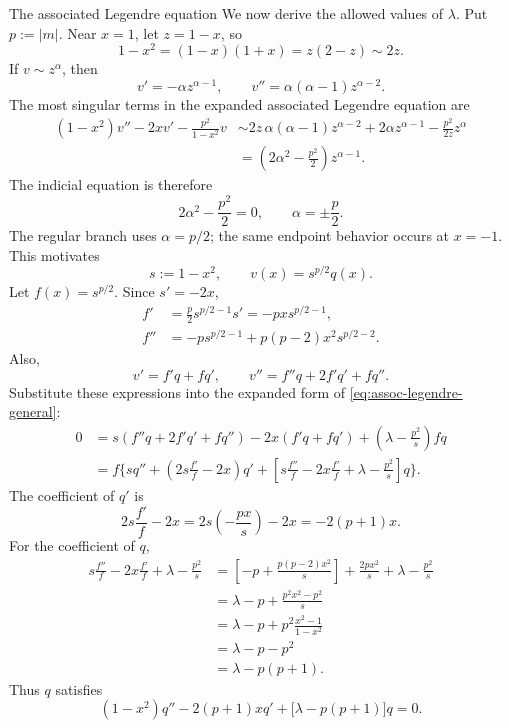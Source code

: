\documentclass[11pt]{beamer}
\begin{document}
\begin{frame}[allowframebreaks]{The associated Legendre equation}
We now derive the allowed values of $\lambda$.  Put $p:=|m|$.  Near
$x=1$, let $z=1-x$, so
\[
  1-x^2=(1-x)(1+x)=z(2-z)\sim2z.
\]
If $v\sim z^\alpha$, then
\[
  v'=-\alpha z^{\alpha-1},
  \qquad
  v''=\alpha(\alpha-1)z^{\alpha-2}.
\]
The most singular terms in the expanded associated Legendre equation are
\begin{align*}
  (1-x^2)v''-2xv'-\frac{p^2}{1-x^2}v
   &\sim
    2z\,\alpha(\alpha-1)z^{\alpha-2}
    +2\alpha z^{\alpha-1}
    -\frac{p^2}{2z}z^\alpha\\
   &=
    \left(2\alpha^2-\frac{p^2}{2}\right)z^{\alpha-1}.
\end{align*}
The indicial equation is therefore
\[
  2\alpha^2-\frac{p^2}{2}=0,
  \qquad
  \alpha=\pm\frac p2.
\]
The regular branch uses $\alpha=p/2$; the same endpoint behavior occurs at
$x=-1$.  This motivates
\[
  s:=1-x^2,
  \qquad
  v(x)=s^{p/2}q(x).
\]
Let $f(x)=s^{p/2}$.  Since $s'=-2x$,
\begin{align*}
  f'
    &=\frac p2s^{p/2-1}s'
      =-pxs^{p/2-1},\\
  f''
    &=-p s^{p/2-1}
      +p(p-2)x^2s^{p/2-2}.
\end{align*}
Also,
\[
  v'=f'q+fq',
  \qquad
  v''=f''q+2f'q'+fq''.
\]
Substitute these expressions into the expanded form of
\eqref{eq:assoc-legendre-general}:
\begin{align*}
  0
   &=
    s(f''q+2f'q'+fq'')
    -2x(f'q+fq')
    +\left(\lambda-\frac{p^2}{s}\right)fq\\
   &=
    f\Bigg\{
      s q''
      +\left(2s\frac{f'}{f}-2x\right)q'
      +\left[
        s\frac{f''}{f}
        -2x\frac{f'}{f}
        +\lambda-\frac{p^2}{s}
       \right]q
    \Bigg\}.
\end{align*}
The coefficient of $q'$ is
\[
  2s\frac{f'}{f}-2x
    =2s\left(-\frac{px}{s}\right)-2x
    =-2(p+1)x.
\]
For the coefficient of $q$,
\begin{align*}
  s\frac{f''}{f}
  -2x\frac{f'}{f}
  +\lambda-\frac{p^2}{s}
   &=
    \left[-p+\frac{p(p-2)x^2}{s}\right]
    +\frac{2px^2}{s}
    +\lambda-\frac{p^2}{s}\\
   &=
    \lambda-p
    +\frac{p^2x^2-p^2}{s}\\
   &=
    \lambda-p
    +p^2\frac{x^2-1}{1-x^2}\\
   &=
    \lambda-p-p^2\\
   &=
    \lambda-p(p+1).
\end{align*}
Thus $q$ satisfies
\begin{equation}
  (1-x^2)q''-2(p+1)xq'
  +\bigl[\lambda-p(p+1)\bigr]q=0.
  \label{eq:assoc-reduced}
\end{equation}


\end{frame}
\end{document}
